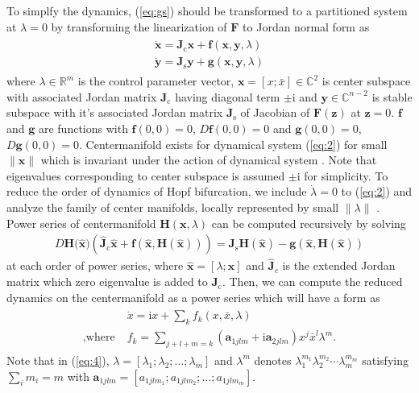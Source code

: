 \documentclass[openacc]{rsproca_new}%
\def\real{\mathbb{R}}
\def\complex{\mathbb{C}}
\def\vec#1{\ensuremath{\mathbf{#1}}}
\newcommand{\Eref}[1]{(\ref{#1})}
\begin{document}
To simplfy the dynamics, \Eref{eq:gs} should be transformed to a partitioned system at \(\lambda=0\) by transforming the linearization of \(\vec{F}\) to Jordan normal form as
\begin{align}\label{eq:2}
  \begin{split}
    \dot{\vec{x}} =\vec{J}_\textrm{c} \vec{x} + \vec{f}(\vec{x},\vec{y},\lambda)\\
    \dot{\vec{y}} =\vec{J}_\textrm{s} \vec{y} +\vec{g}(\vec{x},\vec{y},\lambda)
  \end{split}
\end{align}
where $\lambda \in \real ^m$ is the control parameter vector, $\vec{x}=[x;\bar{x}]\in \complex^2$ is center subspace with associated Jordan matrix $\vec{J}_\textrm{c}$ having diagonal term $\pm\textrm{i}$ and $\vec{y}\in \complex^{n-2}$ is stable subspace with it's associated Jordan matrix $\vec{J}_\textrm{s}$ of Jacobian of $\vec{F}(\vec{z})$ at $\vec{z}=0$.
$\vec{f}$ and $\vec{g}$ are functions with $\vec{f}(0,0)=0$, $D\vec{f}(0,0)=0$ and $\vec{g}(0,0)=0$, $D\vec{g}(0,0)=0$. Centermanifold exists for dynamical system \Eref{eq:2} for small  $\|\vec{x}\|$ which is invariant under the action of dynamical system \cite{carr2012applications}. Note that eigenvalues corresponding to center subspace is assumed $\pm\textrm{i}$ for simplicity. To reduce the order of dynamics of Hopf bifurcation, we include $\dot\lambda=0$ to \Eref{eq:2} and analyze the family of center manifolds, locally represented by small $\|\lambda\|$  \cite{kuznetsov2013elements}. Power series of centermanifold $\vec{H}(\vec{x},\lambda)$ can be computed recursively by solving
\begin{align}\label{eq:3}
    D\vec{H}({\vec{\hat{x})}}(\vec{\hat{J}}_\textrm{c}\vec{\hat{x}}+\vec{f}(\vec{\hat{x}},\vec{H}(\vec{\hat{x}}))) =\vec{J}_\textrm{s} \vec{H}(\vec{\hat{x}})-\vec{g}(\vec{\hat{x}},\vec{H}(\vec{\hat {x}}))
\end{align}
at each order of power series, where \(\vec{\hat{x}}=[\lambda;\vec{x}]\) and \(\vec{\hat{J}}_c\) is the extended Jordan matrix which zero eigenvalue is added to \(\vec{J}_\textrm{c}\). Then, we can compute the reduced dynamics on the centermanifold as a power series which will have a form as
\begin{align}\label{eq:4}
  \begin{split}
    {}&\dot{x} =\textrm{i} x+\sum_k f_k(x,\bar{x},\lambda)\\
    ,\textrm{where} \; & f_k=\sum_{j+l+m=k}(\vec{a}_{1jlm}+\textrm{i}\vec{a}_{2jlm})x^j\bar{x}^l\lambda^m.
  \end{split}
\end{align}
Note that in \Eref{eq:4}, \(\lambda=[\lambda_1;\lambda_2;\ldots;\lambda_m]\) and \(\lambda^m\) denotes \(\lambda_1^{m_1}\lambda_2^{m_2}\cdots\lambda_m^{m_m}\) satisfying \(\sum_i m_i = m\) with \(\vec{a}_{1jlm}=[a_{1jlm_1};a_{1jlm_2};\ldots;a_{1jlm_m}]\).
\end{document}
